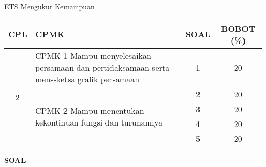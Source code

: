 \documentclass[10pt,openany,a4paper]{article}
\begin{document}
\begin{table}[h]
    \centering
    ETS Mengukur Kemampuan
    \begin{tabular}{|c|m{10.5cm}|c|c|}
        \hline
        CPL & CPMK                                                                                      & SOAL & BOBOT (\%) \\ \hline
        \multirow{5}{*}{2}
            & CPMK-1 Mampu menyelesaikan persamaan dan pertidaksamaan serta menssketsa grafik persamaan & 1    & 20         \\ \cline{2-4}
            & \multirow{4}{*}{CPMK-2 Mampu menentukan kekontinuan fungsi dan turunannya}                & 2    & 20         \\\cline{3-4}
            &                                                                                           & 3    & 20         \\ \cline{3-4}
            &                                                                                           & 4    & 20         \\ \cline{3-4}
            &                                                                                           & 5    & 20         \\ \hline
    \end{tabular}
\end{table}
{\centering\textbf{SOAL}}
\end{document}

